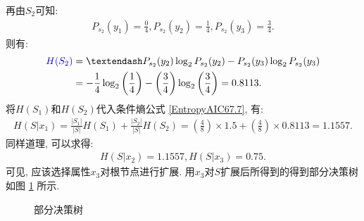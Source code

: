 再由$S_2$可知:
\begin{align}
  P_{s_2} (y_1)=\frac 0 4, P_{s_2} (y_2)=\frac 1 4, P_{s_2} (y_3)=\frac 3 4.
\end{align}
则有:
\begin{align}
    \textcolor[rgb]{0,0,1}{H(S_2)}&=– P_{s_2} (y_2)\log_2 P_{s_2} (y_2 )- P_{s_2} (y_3)\log_2 P_{s_2} (y_3)\notag\\
          &=-\frac 1 4\log_2\left (\frac 1 4\right)- \left (\frac 3 4\right)\log_2\left (\frac 3 4\right) =0.8113.
\end{align}
将$H (S_1)$和$H (S_2)$代入条件熵公式 \ref{EntropyAIC67.7}, 有:
\begin{align}
    H(S|x_1)= \frac{|S_1|}{|S|} H (S_1)+ \frac{|S_2|}{|S|} H (S_2)=\left (\frac 4 8\right)\times 1.5+\left (\frac 4 8\right)\times 0.8113 =1.1557.
\end{align}
同样道理, 可以求得:
\begin{align}
    H(S|x_2)=1.1557, H(S|x_3)=0.75.
\end{align}
可见, 应该选择属性$x_3$对根节点进行扩展. 用$x_3$对$S$扩展后所得到的得到部分决策树如图 \ref{bufenjueceshu2019112901} 所示.
\begin{figure}[H]
\begin{center}
\caption{部分决策树}
\label{bufenjueceshu2019112901}
\end{center}
\end{figure}

